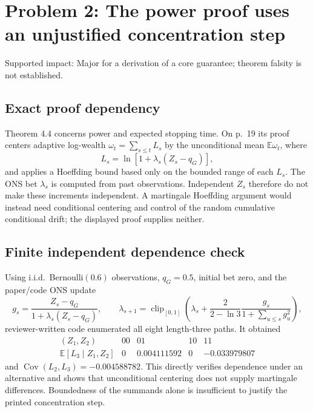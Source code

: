 \documentclass[10pt]{article}
\begin{document}
\section*{Problem 2: The power proof uses an unjustified concentration step}
Supported impact: Major for a derivation of a core guarantee; theorem falsity is not established.\par
\subsection*{Exact proof dependency}
Theorem 4.4 concerns power and expected stopping time. On p. 19 its proof centers adaptive log-wealth \(\omega_t=\sum_{s\le t}L_s\) by the unconditional mean \(\mathbb E\omega_t\), where \[L_s=\ln[1+\lambda_s(Z_s-q_G)],\] and applies a Hoeffding bound based only on the bounded range of each \(L_s\). The ONS bet \(\lambda_s\) is computed from past observations. Independent \(Z_s\) therefore do not make these increments independent. A martingale Hoeffding argument would instead need conditional centering and control of the random cumulative conditional drift; the displayed proof supplies neither.\par
\subsection*{Finite independent dependence check}
Using i.i.d. Bernoulli\((0.6)\) observations, \(q_G=0.5\), initial bet zero, and the paper/code ONS update \[g_s=\frac{Z_s-q_G}{1+\lambda_s(Z_s-q_G)},\qquad
 \lambda_{s+1}=\operatorname{clip}_{[0,1]}
 \left(\lambda_s+\frac{2}{2-\ln3}\frac{g_s}{1+\sum_{u\le s}g_u^2}\right),\] reviewer-written code enumerated all eight length-three paths. It obtained \[\begin{array}{c|rrrr}
 (Z_1,Z_2)&00&01&10&11\\ \hline
 \mathbb E[L_3\mid Z_1,Z_2]&0&0.004111592&0&-0.033979807
\end{array}\] and \(\operatorname{Cov}(L_2,L_3)=-0.004588782\). This directly verifies dependence under an alternative and shows that unconditional centering does not supply martingale differences. Boundedness of the summands alone is insufficient to justify the printed concentration step.\par
\end{document}
